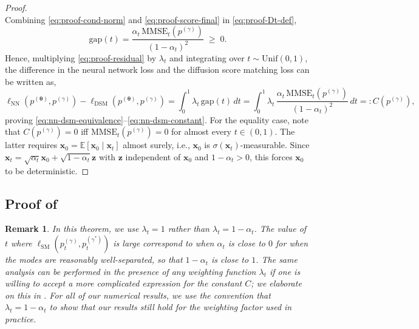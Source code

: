 \documentclass[11pt]{article}
\newcommand{\vect}[1]{\mathbf{#1}}
\theoremstyle{plain}
\newtheorem{remark}{Remark}
\newcommand{\1}{\mathbbm{1}}
\newcommand{\btheta}{{\boldsymbol{\theta}}}
\newcommand{\vx}{\vect{x}}
\newcommand{\ldsm}{\ell_\mathrm{DSM}}
\newcommand{\lsm}{\ell_\mathrm{SM}}
\newcommand{\lnn}{\ell_{\mathrm{NN}}}
\newcommand{\pdist}[2][]{p_{#1}^{(#2)}}
\begin{document}
\begin{appendices}
\begin{proof}
\begin{equation}
   \label{eq:proof-score-final}
\end{equation}
Combining \eqref{eq:proof-cond-norm} and \eqref{eq:proof-score-final} in \eqref{eq:proof-Dt-def},
\begin{equation}
   \mathrm{gap}(t) = \frac{\alpha_t\,\mathrm{MMSE}_t(\pdist{\gamma})}{(1-\alpha_t)^2} \;\ge\; 0.
   \label{eq:proof-Dt-final}
\end{equation}
Hence, multiplying \eqref{eq:proof-residual} by $\lambda_t$ and integrating over $t\sim \mathrm{Unif}(0,1)$, the difference in the neural network loss and the diffusion score matching loss can be written as, 
\begin{equation}
   \lnn(\pdist{\btheta}, \pdist{\gamma}) - \ldsm(\pdist{\btheta}, \pdist{\gamma})
   = \int_0^1 \lambda_t\,\mathrm{gap}(t)\,dt
   = \int_0^1 \lambda_t\,\frac{\alpha_t\,\mathrm{MMSE}_t(\pdist{\gamma})}{(1-\alpha_t)^2}\,dt
   =: C(\pdist{\gamma}),
\end{equation}
proving \eqref{eq:nn-dsm-equivalence}--\eqref{eq:nn-dsm-constant}.
For the equality case, note that $C(\pdist{\gamma}) = 0$ iff $\mathrm{MMSE}_t(\pdist{\gamma}) = 0$ for almost every $t \in (0,1)$. The latter requires $\vx_0 = \mathbb{E}[\vx_0\mid\vx_t]$ almost surely, i.e., $\vx_0$ is $\sigma(\vx_t)$-measurable. Since $\vx_t = \sqrt{\alpha_t}\vx_0 + \sqrt{1-\alpha_t}\vect{z}$ with $\vect{z}$ independent of $\vx_0$ and $1-\alpha_t > 0$, this forces $\vx_0$ to be deterministic.
\end{proof}




\subsection{Proof of  }\label{Proof of Theorem 1}



\begin{remark}
    In this theorem, we use $\lambda_t=1$ rather than $\lambda_t= 1-\alpha_t$. 
    The value of $t$ where $\lsm(\pdist[t]{\gamma},\pdist[t]{\gamma^*})$ is large correspond to when $\alpha_t$ is close to $0$ for when the modes are reasonably well-separated, so that $1-\alpha_t$ is close to $1$. The same analysis can be performed in the presence of any weighting function $\lambda_t$ if one is willing to accept a more complicated expression for the constant $C$; we elaborate on this in . For all of our numerical results, we use the convention that $\lambda_t=1-\alpha_t$ to show that our results still hold for the weighting factor used in practice.
\end{remark}



\end{appendices}
\end{document}
